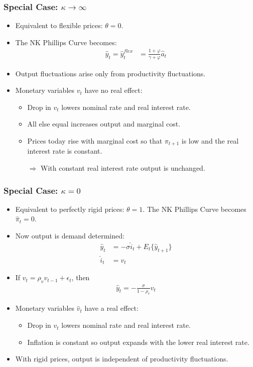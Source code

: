 \documentclass[english,xcolor=svgnames]{beamer}
\begin{document}
\begin{frame}
\frametitle{Special Case: $\kappa\rightarrow\infty$}
\begin{itemize}
	\item Equivalent to flexible prices: $\theta=0$.
	\item The NK Phillips Curve becomes:
	\begin{align*}
		\hat{y}_t = \hat{y}_t^{flex}&=\frac{1+\varphi}{\gamma+\varphi}\hat{a}_t 
	\end{align*}
	\item Output fluctuations arise only from productivity fluctuations.
	\item Monetary variables $v_t$ have no real effect:
	\begin{itemize}
		\item Drop in $v_t$ lowers nominal rate and real interest rate.
		\item All else equal increases output and marginal cost.
		\item Prices today rise with marginal cost so that $\pi_{t+1}$ is low and the real interest rate is constant.
		\item[$\Rightarrow$] With constant real interest rate output is unchanged.
	\end{itemize}
\end{itemize}
\end{frame}

\begin{frame}
\frametitle{Special Case: $\kappa=0$}
\begin{itemize}
	\item Equivalent to perfectly rigid prices: $\theta=1$.  The NK Phillips Curve becomes $\hat{\pi}_t=0$.
	\item Now output is demand determined:
	\begin{align*}
		\hat{y}_t &=-\sigma\hat{i}_t +E_t\{\hat{y}_{t+1}\} \\
		\hat{i}_t&=v_t 
	\end{align*}
	\item If $v_t = \rho_v v_{t-1}+\epsilon_t$, then
	\begin{align*}
		\hat{y}_t = -\frac{\sigma}{1-\rho_v}v_t
	\end{align*}
	\item Monetary variables $\hat{v}_t$ have a real effect:
	\begin{itemize}
		\item Drop in $v_t$ lowers nominal rate and real interest rate.
		\item Inflation is constant so output expands with the lower real interest rate.
	\end{itemize}
	\item With rigid prices, output is independent of productivity fluctuations.
\end{itemize}
\end{frame}
\end{document}
